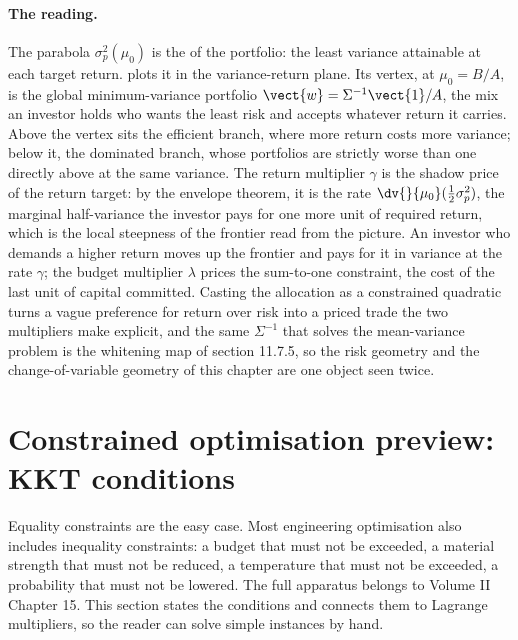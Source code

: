 \paragraph{The reading.} The parabola $\sigma_{p}^{2}(\mu_{0})$ is the
 of the portfolio: the least variance
attainable at each target return.
 plots it in the
variance-return plane. Its vertex, at $\mu_{0} = B/A$, is the
global minimum-variance portfolio $\vect{w} = \Sigma^{-1}\vect{1}/A$,
the mix an investor holds who wants the least risk and accepts
whatever return it carries. Above the vertex sits the efficient
branch, where more return costs more variance; below it, the
dominated branch, whose portfolios are strictly worse than one
directly above at the same variance. The return multiplier $\gamma$
is the shadow price of the return target: by the envelope theorem, it
is the rate $\dv{}{\mu_{0}}(\tfrac{1}{2}\sigma_{p}^{2})$, the marginal
half-variance the investor pays for one more unit of required return,
which is the local steepness of the frontier read from the picture.
An investor who demands a higher return moves up the frontier and
pays for it in variance at the rate $\gamma$; the budget multiplier
$\lambda$ prices the sum-to-one constraint, the cost of the last unit
of capital committed. Casting the allocation as a constrained
quadratic turns a vague preference for return over risk into a
priced trade the two multipliers make explicit, and the same
$\Sigma^{-1}$ that solves the mean-variance problem is the whitening
map of section 11.7.5, so the risk geometry and the change-of-variable
geometry of this chapter are one object seen twice.



\section{Constrained optimisation preview: KKT conditions}

Equality constraints are the easy case. Most engineering optimisation
also includes inequality constraints: a budget that must not be
exceeded, a material strength that must not be reduced, a temperature
that must not be exceeded, a probability that must not be lowered.
The full apparatus belongs to Volume II Chapter 15. This section
states the conditions and connects them to Lagrange multipliers, so
the reader can solve simple instances by hand.


